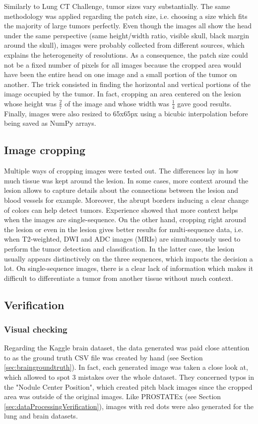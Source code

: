 Similarly to Lung CT Challenge, tumor sizes vary substantially. The same methodology was applied regarding the patch size, i.e. choosing a size which fits the majority of large tumors perfectly. Even though the images all show the head under the same perspective (same height/width ratio, visible skull, black margin around the skull), images were probably collected from different sources, which explains the heterogeneity of resolutions. As a consequence, the patch size could not be a fixed number of pixels for all images because the cropped area would have been the entire head on one image and a small portion of the tumor on another. The trick consisted in finding the horizontal and vertical portions of the image occupied by the tumor. In fact, cropping an area centered on the lesion whose height was $\frac{2}{7}$ of the image and whose width was $\frac{1}{4}$ gave good results. Finally, images were also resized to 65x65px using a bicubic interpolation before being saved as NumPy arrays. 


\subsection{Image cropping}
\setlength{\marginparwidth}{3cm}\leavevmode {}Multiple ways of cropping images were tested out. The differences lay in how much tissue was kept around the lesion. In some cases, more context around the lesion allows to capture details about the connections between the lesion and blood vessels for example. Moreover, the abrupt borders inducing a clear change of colors can help detect tumors. Experience showed that more context helps when the images are single-sequence. On the other hand, cropping right around the lesion or even in the lesion gives better results for multi-sequence data, i.e. when T2-weighted, DWI and ADC images (MRIs) are simultaneously used to perform the tumor detection and classification. In the latter case, the lesion usually appears distinctively on the three sequences, which impacts the decision a lot. On single-sequence images, there is a clear lack of information which makes it difficult to differentiate a tumor from another tissue without much context. 


\subsection{Verification}
\subsubsection{Visual checking}
\setlength{\marginparwidth}{3cm}\leavevmode {}Regarding the Kaggle brain dataset, the data generated was paid close attention to as the ground truth CSV file was created by hand (see Section \ref{sec:braingroundtruth}). In fact, each generated image was taken a close look at, which allowed to spot 3 mistakes over the whole dataset. They concerned typos in the "Nodule Center Position", which created pitch black images since the cropped area was outside of the original images.
Like PROSTATEx (see Section \ref{sec:dataProcessingVerification}), images with red dots were also generated for the lung and brain datasets. 


